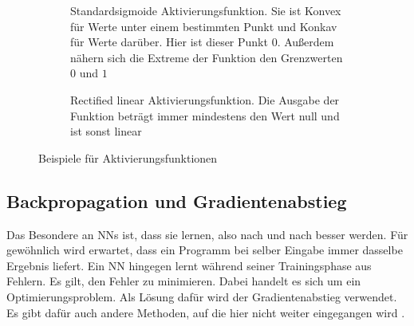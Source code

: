 \begin{figure}
  \centering
  \begin{subfigure}{.5\textwidth}
    \centering
    \caption{Standardsigmoide Aktivierungsfunktion. Sie ist Konvex für Werte unter einem bestimmten Punkt und Konkav für Werte darüber. Hier ist dieser Punkt $0$. Außerdem nähern sich die Extreme der Funktion den Grenzwerten $0$ und $1$}
    \label{fig:sigmoid}
  \end{subfigure}%
  \begin{subfigure}{.5\textwidth}
    \centering
    \caption{Rectified linear Aktivierungsfunktion. Die Ausgabe der Funktion beträgt immer mindestens den Wert null und ist sonst linear}
    \label{fig:Relu}
  \end{subfigure}
  \caption{Beispiele für Aktivierungsfunktionen}
  \label{fig:activationfunction}
\end{figure}

\subsection{Backpropagation und Gradientenabstieg}
\label{chap:bpGradient}
Das Besondere an \acp{NN} ist, dass sie lernen, also nach und nach besser werden. Für gewöhnlich wird erwartet, dass ein Programm bei selber Eingabe immer dasselbe Ergebnis liefert. Ein \ac{NN} hingegen lernt während seiner Trainingsphase aus Fehlern. Es gilt, den Fehler zu minimieren. Dabei handelt es sich um ein Optimierungsproblem. Als Lösung dafür wird der Gradientenabstieg verwendet. Es gibt dafür auch andere Methoden, auf die hier nicht weiter eingegangen wird \cite{StockfishNNUE}.

